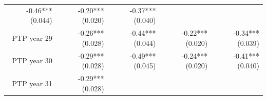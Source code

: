 \documentclass[]{article}
\begin{document}
\begin{longtable}[c]{@{}rrrrr@{}}
\begin{minipage}[t]{0.16\columnwidth}
-0.46*** (0.044)
\strut\end{minipage} &
\begin{minipage}[t]{0.18\columnwidth}\raggedleft\strut
-0.20*** (0.020)
\strut\end{minipage} &
\begin{minipage}[t]{0.15\columnwidth}\raggedleft\strut
-0.37*** (0.040)
\strut\end{minipage}\tabularnewline
\begin{minipage}[t]{0.17\columnwidth}\raggedleft\strut
PTP year 29
\strut\end{minipage} &
\begin{minipage}[t]{0.20\columnwidth}\raggedleft\strut
-0.26*** (0.028)
\strut\end{minipage} &
\begin{minipage}[t]{0.16\columnwidth}\raggedleft\strut
-0.44*** (0.044)
\strut\end{minipage} &
\begin{minipage}[t]{0.18\columnwidth}\raggedleft\strut
-0.22*** (0.020)
\strut\end{minipage} &
\begin{minipage}[t]{0.15\columnwidth}\raggedleft\strut
-0.34*** (0.039)
\strut\end{minipage}\tabularnewline
\begin{minipage}[t]{0.17\columnwidth}\raggedleft\strut
PTP year 30
\strut\end{minipage} &
\begin{minipage}[t]{0.20\columnwidth}\raggedleft\strut
-0.29*** (0.028)
\strut\end{minipage} &
\begin{minipage}[t]{0.16\columnwidth}\raggedleft\strut
-0.49*** (0.045)
\strut\end{minipage} &
\begin{minipage}[t]{0.18\columnwidth}\raggedleft\strut
-0.24*** (0.020)
\strut\end{minipage} &
\begin{minipage}[t]{0.15\columnwidth}\raggedleft\strut
-0.41*** (0.040)
\strut\end{minipage}\tabularnewline
\begin{minipage}[t]{0.17\columnwidth}\raggedleft\strut
PTP year 31
\strut\end{minipage} &
\begin{minipage}[t]{0.20\columnwidth}\raggedleft\strut
-0.29*** (0.028)
\strut\end{minipage} &
\begin{minipage}[t]{0.16\columnwidth}\raggedleft\strut

\end{minipage}
\end{longtable}
\end{document}
